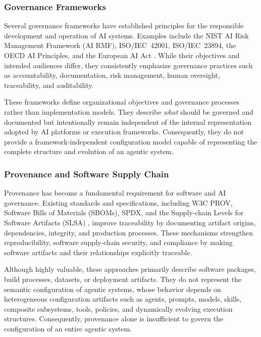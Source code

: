 \documentclass[10pt]{article}
\begin{document}
\subsubsection{Governance Frameworks}
\label{sec:governance_frameworks}

Several governance frameworks have established principles for the responsible development and operation of AI systems. Examples include the NIST AI Risk Management Framework (AI RMF), ISO/IEC~42001, ISO/IEC~23894, the OECD AI Principles, and the European AI Act \cite{ai2023artificial, benraouane2024ai, simonetta2024iso, yeung2020recommendation, edwards2021eu}. While their objectives and intended audiences differ, they consistently emphasize governance practices such as accountability, documentation, risk management, human oversight, traceability, and auditability.

These frameworks define organizational objectives and governance processes rather than implementation models. They describe \emph{what} should be governed and documented but intentionally remain independent of the internal representation adopted by AI platforms or execution frameworks. Consequently, they do not provide a framework-independent configuration model capable of representing the complete structure and evolution of an agentic system.

\subsubsection{Provenance and Software Supply Chain}
\label{sec:provenance_supply_chain}

Provenance has become a fundamental requirement for software and AI governance. Existing standards and specifications, including W3C PROV, Software Bills of Materials (SBOMs), SPDX, and the Supply-chain Levels for Software Artifacts (SLSA) \cite{missier2013w3c, SBOM10336262, stewart2010software, okafor2022sok, cobbe2023understanding}, improve traceability by documenting artifact origins, dependencies, integrity, and production processes. These mechanisms strengthen reproducibility, software supply-chain security, and compliance by making software artifacts and their relationships explicitly traceable.

Although highly valuable, these approaches primarily describe software packages, build processes, datasets, or deployment artifacts. They do not represent the semantic configuration of agentic systems, whose behavior depends on heterogeneous configuration artifacts such as agents, prompts, models, skills, composite subsystems, tools, policies, and dynamically evolving execution structures. Consequently, provenance alone is insufficient to govern the configuration of an entire agentic system.
\end{document}
